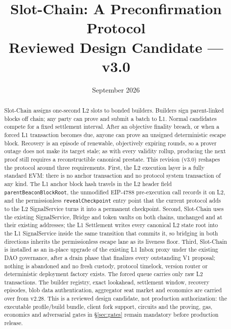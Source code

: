\documentclass[a4paper,11pt]{article}
\newcommand{\code}[1]{\nolinkurl{#1}}
\begin{document}
\title{\vspace{-1.2cm}\bfseries Slot-Chain: A Preconfirmation Protocol\\[0.2em]
\large\mdseries Reviewed Design Candidate --- v3.0}
\author{}
\date{September 2026}
\maketitle
\thispagestyle{fancy}

\begin{abstract}
Slot-Chain assigns one-second L2 slots to bonded builders.  Builders sign
parent-linked blocks off chain; any party can prove and submit a batch to L1.
Normal candidates compete for a fixed settlement interval.  After an objective
finality breach, or when a forced L1 transaction becomes due, anyone can prove
an unsigned deterministic escape block.  Recovery is an episode of renewable,
objectively expiring rounds, so a prover outage does not make its target stale;
as with every validity rollup, producing the next proof still requires a
reconstructible canonical prestate.
This revision (v3.0) reshapes the protocol around three requirements.  First,
the L2 execution layer is a fully standard EVM: there is no anchor transaction
and no protocol system transaction of any kind.  The L1 anchor block hash
travels in the L2 header field \code{parentBeaconBlockRoot}, the unmodified
EIP-4788 pre-execution call records it on L2, and the permissionless
\code{revealCheckpoint} entry point that the current protocol adds to the L2
SignalService turns it into a permanent checkpoint.  Second, Slot-Chain uses
the existing SignalService, Bridge and token vaults on both chains, unchanged
and at their existing addresses; the L1 Settlement writes every canonical L2
state root into the L1 SignalService inside the same transition that commits
it, so bridging in both directions inherits the permissionless escape lane as
its liveness floor.  Third, Slot-Chain is installed as an in-place upgrade of
the existing L1 Inbox proxy under the existing DAO governance, after a drain
phase that finalizes every outstanding V1 proposal; nothing is abandoned and
no fresh custody, protocol timelock, version router or deterministic
deployment factory exists.  The forced queue carries only raw L2 transactions.
The builder registry, exact lookahead, settlement window, recovery episodes,
blob data authentication, aggregator seat market and economics are carried
over from v2.28.  This is a reviewed design candidate, not production
authorization: the executable profile/build bundle, client fork support,
circuits and the proving, gas, economics and adversarial gates in
\S\ref{sec:gates} remain mandatory before production release.
\end{abstract}
\end{document}
